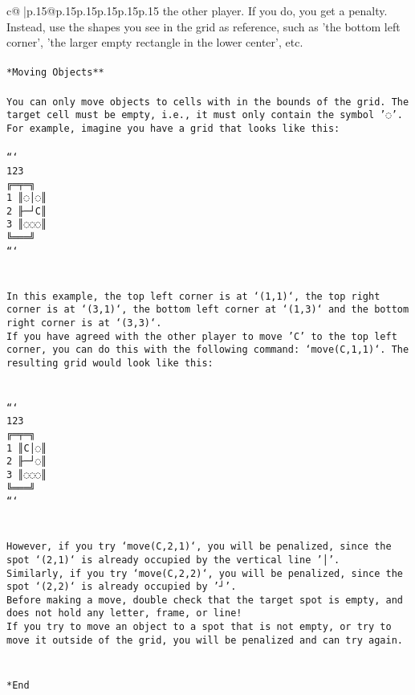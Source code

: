 \documentclass{article}
\begin{document}
{\begin{supertabular}{c@{$\;$}|p{.15\linewidth}@{}p{.15\linewidth}p{.15\linewidth}p{.15\linewidth}p{.15\linewidth}p{.15\linewidth}}
{{{the other player. If you do, you get a penalty. Instead, use the shapes you see in the grid as reference, such as 'the bottom left corner', 'the larger empty rectangle in the lower center', etc.\\ \tt \\ \tt **Moving Objects**\\ \tt \\ \tt * You can only move objects to cells with in the bounds of the grid. The target cell must be empty, i.e., it must only contain the symbol '◌'.\\ \tt * For example, imagine you have a grid that looks like this: \\ \tt \\ \tt ```\\ \tt     123\\ \tt    ╔═╤═╗\\ \tt  1 ║◌│◌║\\ \tt  2 ╟─┘C║\\ \tt  3 ║◌◌◌║\\ \tt    ╚═══╝\\ \tt ```\\ \tt \\ \tt \\ \tt * In this example, the top left corner is at `(1,1)`, the top right corner is at `(3,1)`, the bottom left corner at `(1,3)` and the bottom right corner is at `(3,3)`.\\ \tt * If you have agreed with the other player to move 'C' to the top left corner, you can do this with the following command: `move(C,1,1)`. The resulting grid would look like this: \\ \tt \\ \tt \\ \tt ```\\ \tt     123\\ \tt    ╔═╤═╗\\ \tt  1 ║C│◌║\\ \tt  2 ╟─┘◌║\\ \tt  3 ║◌◌◌║\\ \tt    ╚═══╝\\ \tt ```\\ \tt \\ \tt \\ \tt * However, if you try `move(C,2,1)`, you will be penalized, since the spot `(2,1)` is already occupied by the vertical line '│'.\\ \tt * Similarly, if you try `move(C,2,2)`, you will be penalized, since the spot `(2,2)` is already occupied by '┘'.\\ \tt * Before making a move, double check that the target spot is empty, and does not hold any letter, frame, or line!\\ \tt * If you try to move an object to a spot that is not empty, or try to move it outside of the grid, you will be penalized and can try again.\\ \tt \\ \tt \\ \tt **End }}}
\end{supertabular}}
\end{document}
